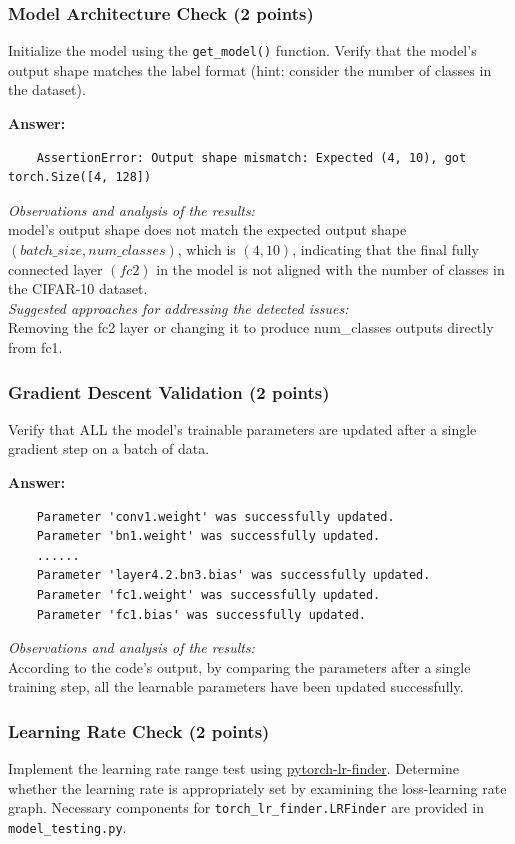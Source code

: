 \documentclass[11pt, oneside]{article}   	%
\begin{document}
\subsubsection*{Model Architecture Check (2 points)}
Initialize the model using the \texttt{get\_model()} function. Verify that the model’s output shape matches the label format (hint: consider the number of classes in the dataset).

\textbf{Answer:} 
\begin{verbatim}
    AssertionError: Output shape mismatch: Expected (4, 10), got torch.Size([4, 128])
\end{verbatim}
\textit{Observations and analysis of the results: }
\\
model's output shape does not match the expected output shape $(batch\_size, num\_classes)$, which is $(4, 10)$, indicating that the final fully connected layer $(fc2)$ in the model is not aligned with the number of classes in the CIFAR-10 dataset.
\\
\textit{Suggested approaches for addressing the detected issues: }
\\
Removing the fc2 layer or changing it to produce num\_classes outputs directly from fc1.

\subsubsection*{Gradient Descent Validation (2 points)}
Verify that ALL the model's trainable parameters are updated after a single gradient step on a batch of data.

\textbf{Answer:}
\begin{verbatim}
    Parameter 'conv1.weight' was successfully updated.
    Parameter 'bn1.weight' was successfully updated.
    ......
    Parameter 'layer4.2.bn3.bias' was successfully updated.
    Parameter 'fc1.weight' was successfully updated.
    Parameter 'fc1.bias' was successfully updated.
\end{verbatim}
\textit{Observations and analysis of the results: }
\\
According to the code's output, by comparing the parameters after a single training step, all the learnable parameters have been updated successfully.

\subsubsection*{Learning Rate Check (2 points)}
Implement the learning rate range test using \href{https://github.com/davidtvs/pytorch-lr-finder#tweaked-version-from-fastaiauto}{pytorch-lr-finder}. Determine whether the learning rate is appropriately set by examining the loss-learning rate graph. Necessary components for \texttt{torch\_lr\_finder.LRFinder} are provided in \texttt{model\_testing.py}.
\end{document}
